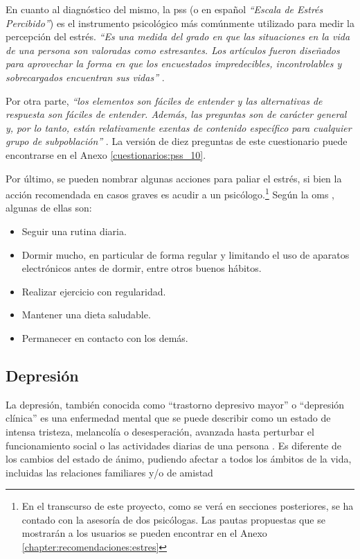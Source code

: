         En cuanto al diagnóstico del mismo, la \gls{pss} (o en español \textit{``Escala de Estrés Percibido''}) es el instrumento psicológico más comúnmente utilizado para medir la percepción del estrés. \textit{``Es una medida del grado en que las situaciones en la vida de una persona son valoradas como estresantes. Los artículos fueron diseñados para aprovechar la forma en que los encuestados impredecibles, incontrolables y sobrecargados encuentran sus vidas''} \cite{currid_efectos_2019}. 
        
        Por otra parte, \textit{``los elementos son fáciles de entender y las alternativas de respuesta son fáciles de entender. Además, las preguntas son de carácter general y, por lo tanto, están relativamente exentas de contenido específico para cualquier grupo de subpoblación''} \cite{cohen_global_1983}. La versión de diez preguntas de este cuestionario puede encontrarse en el Anexo \ref{cuestionarios:pss_10}.

        Por último, se pueden nombrar algunas acciones para paliar el estrés, si bien la acción recomendada en casos graves es acudir a un psicólogo.\footnote{En el transcurso de este proyecto, como se verá en secciones posteriores, se ha contado con la asesoría de dos psicólogas. Las pautas propuestas que se mostrarán a los usuarios se pueden encontrar en el Anexo \ref{chapter:recomendaciones:estres}} Según la \gls{oms} \cite{oms_estres_2023}, algunas de ellas son: 
        \begin{itemize}
            \item Seguir una rutina diaria.
            \item Dormir mucho, en particular de forma regular y limitando el uso de aparatos electrónicos antes de dormir, entre otros buenos hábitos.
            \item Realizar ejercicio con regularidad.
            \item Mantener una dieta saludable.
            \item Permanecer en contacto con los demás.
        \end{itemize}


    \subsection{Depresión}

        La depresión, también conocida como ``trastorno depresivo mayor'' o ``depresión clínica'' es una enfermedad mental que se puede describir como un estado de intensa tristeza, melancolía o desesperación, avanzada hasta perturbar el funcionamiento social o las actividades diarias de una persona \cite{van_neerven_rarrxr_2008}. Es diferente de los cambios del estado de ánimo, pudiendo afectar a todos los ámbitos de la vida, incluidas las relaciones familiares y/o de amistad \cite{oms_depresion_2023}
        
